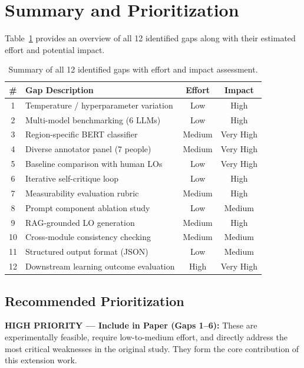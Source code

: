 \documentclass[11pt,a4paper]{article}
\begin{document}
\section{Summary and Prioritization}

Table~\ref{tab:summary} provides an overview of all 12 identified gaps along with their estimated effort and potential impact.

\begin{table}[H]
\centering
\caption{Summary of all 12 identified gaps with effort and impact assessment.}
\label{tab:summary}
\begin{tabular}{@{}clcc@{}}
\toprule
\textbf{\#} & \textbf{Gap Description} & \textbf{Effort} & \textbf{Impact} \\
\midrule
1 & Temperature / hyperparameter variation & Low & High \\
2 & Multi-model benchmarking (6 LLMs) & Low & High \\
3 & Region-specific BERT classifier & Medium & Very High \\
4 & Diverse annotator panel (7 people) & Medium & Very High \\
5 & Baseline comparison with human LOs & Low & Very High \\
6 & Iterative self-critique loop & Low & High \\
\midrule
7 & Measurability evaluation rubric & Medium & High \\
8 & Prompt component ablation study & Low & Medium \\
9 & RAG-grounded LO generation & Medium & High \\
10 & Cross-module consistency checking & Medium & Medium \\
11 & Structured output format (JSON) & Low & Medium \\
\midrule
12 & Downstream learning outcome evaluation & High & Very High \\
\bottomrule
\end{tabular}
\end{table}

\subsection{Recommended Prioritization}

\begin{greenbox}
\textbf{HIGH PRIORITY --- Include in Paper (Gaps 1--6):} These are experimentally feasible, require low-to-medium effort, and directly address the most critical weaknesses in the original study. They form the core contribution of this extension work.
\end{greenbox}
\end{document}
